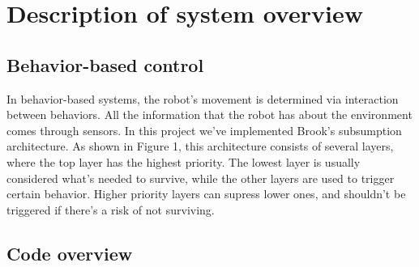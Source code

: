 \section{Description of system overview}

\subsection{Behavior-based control}


In behavior-based systems, the robot’s movement is determined via interaction between behaviors. All the information that the robot has about the environment comes through sensors. In this project we’ve implemented Brook’s subsumption architecture. As shown in Figure 1, this architecture consists of several layers, where the top layer has the highest priority. The lowest layer is usually considered what’s needed to survive, while the other layers are used to trigger certain behavior. Higher priority layers can supress lower ones, and shouldn’t be triggered if there’s a risk of not surviving.


\subsection{Code overview}

